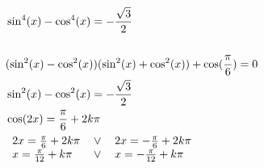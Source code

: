 \documentclass[preview,convert={density=300,outext=.png}]{standalone}
\begin{document}
\begin{align*}
    & \sin^4(x) - \cos^4(x) = -\frac{\sqrt{3}}{2} \\
    & \\
    & (\sin^2(x) - \cos^2(x))(\sin^2(x) + \cos^2(x)) + \cos(\frac{\pi}{6}) = 0 \\
    & \sin^2(x) - \cos^2(x) = -\frac{\sqrt{3}}{2} \\
    & \cos(2x) = \frac{\pi}{6} + 2k\pi \\
    & \begin{tabular}{ l l l }
        $2x = \frac{\pi}{6} + 2k\pi$ & $\vee$ & $2x = -\frac{\pi}{6} + 2k\pi$ \\
        $x = \frac{\pi}{12} + k\pi$ & $\vee$ & $x = -\frac{\pi}{12} + k\pi$ \\
    \end{tabular}
\end{align*}
\end{document}
